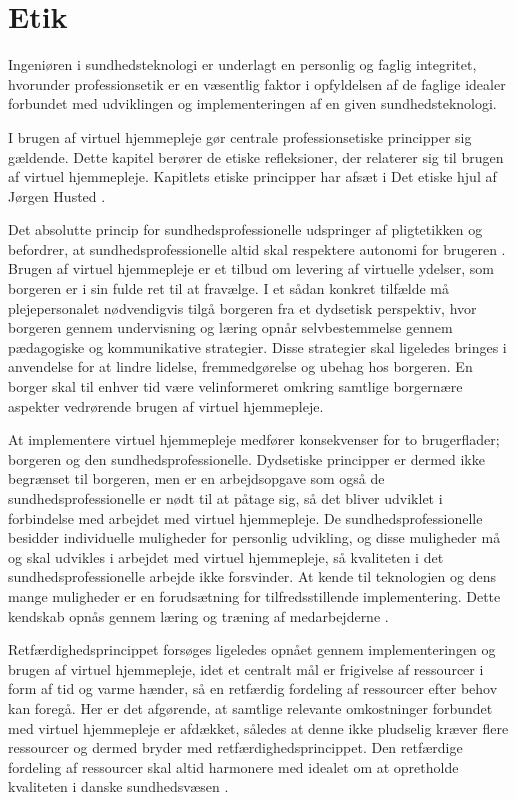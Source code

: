 \chapter{Etik}
Ingeniøren i sundhedsteknologi er underlagt en personlig og faglig integritet, hvorunder professionsetik er en væsentlig faktor i opfyldelsen af de faglige idealer forbundet med udviklingen og implementeringen af en given sundhedsteknologi.

I brugen af virtuel hjemmepleje gør centrale professionsetiske principper sig gældende. Dette kapitel berører de etiske refleksioner, der relaterer sig til brugen af virtuel hjemmepleje. Kapitlets etiske principper har afsæt i Det etiske hjul af Jørgen Husted \cite{etiskhjul}. 

Det absolutte princip for sundhedsprofessionelle udspringer af pligtetikken og befordrer, at sundhedsprofessionelle altid skal respektere autonomi for brugeren \cite{mtv}. Brugen af virtuel hjemmepleje er et tilbud om levering af virtuelle ydelser, som borgeren er i sin fulde ret til at fravælge. I et sådan konkret tilfælde må plejepersonalet nødvendigvis tilgå borgeren fra et dydsetisk perspektiv, hvor borgeren gennem undervisning og læring opnår selvbestemmelse gennem pædagogiske og kommunikative strategier. Disse strategier skal ligeledes bringes i anvendelse for at lindre lidelse, fremmedgørelse og ubehag hos borgeren. En borger skal til enhver tid være velinformeret omkring samtlige borgernære aspekter vedrørende brugen af virtuel hjemmepleje. 

At implementere virtuel hjemmepleje medfører konsekvenser for to brugerflader; borgeren og den sundhedsprofessionelle. Dydsetiske principper er dermed ikke begrænset til borgeren, men er en arbejdsopgave som også de sundhedsprofessionelle er nødt til at påtage sig, så det bliver udviklet i forbindelse med arbejdet med virtuel hjemmepleje. De sundhedsprofessionelle besidder individuelle muligheder for personlig udvikling, og disse muligheder må og skal udvikles i arbejdet med virtuel hjemmepleje, så kvaliteten i det sundhedsprofessionelle arbejde ikke forsvinder. At kende til teknologien og dens mange muligheder er en forudsætning for tilfredsstillende implementering. Dette kendskab opnås gennem læring og træning af medarbejderne \cite{mtv}. 

Retfærdighedsprincippet forsøges ligeledes opnået gennem implementeringen og brugen af virtuel hjemmepleje, idet et centralt mål er frigivelse af ressourcer i form af tid og varme hænder, så en retfærdig fordeling af ressourcer efter behov kan foregå. Her er det afgørende, at samtlige relevante omkostninger forbundet med virtuel hjemmepleje er afdækket, således at denne ikke pludselig kræver flere ressourcer og dermed bryder med retfærdighedsprincippet. Den retfærdige fordeling af ressourcer skal altid harmonere med idealet om at opretholde kvaliteten i danske sundhedsvæsen \cite{mtv}.


